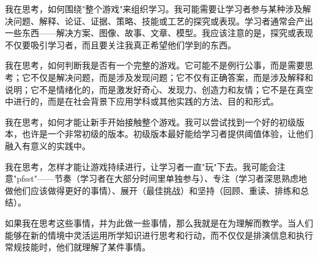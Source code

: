 我在思考，如何围绕"整个游戏"来组织学习。我可能需要让学习者参与某种涉及解决问题、解释、论证、证据、策略、技能或工艺的探究或表现。学习者通常会产出一些东西——解决方案、图像、故事、文章、模型。我应该注意的是，探究或表现不仅要吸引学习者，而且要关注我真正希望他们学到的东西。

我在思考，如何判断我是否有一个完整的游戏。它可能不是例行公事，而是需要思考；它不仅是解决问题，而是涉及发现问题；它不仅有正确答案，而是涉及解释和说明；它不是情绪化的，而是激发好奇心、发现力、创造力和友情；它不是在真空中进行的，而是在社会背景下应用学科或其他实践的方法、目的和形式。

我在思考，如何才能让新手开始接触整个游戏。我可以尝试找到一个好的初级版本，也许是一个非常初级的版本。初级版本最好能给学习者提供阈值体验，让他们融入有意义的实践中。

我在思考，怎样才能让游戏持续进行，让学习者一直"玩"下去。我可能会注意"pfsst"——节奏（学习者在大部分时间里单独参与）、专注（学习者深思熟虑地做他们应该做得更好的事情）、展开（最佳挑战）和坚持（回顾、重读、排练和总结）。

如果我在思考这些事情，并为此做一些事情，那么我就是在为理解而教学。当人们能够在新的情境中灵活运用所学知识进行思考和行动，而不仅仅是排演信息和执行常规技能时，他们就理解了某件事情。
